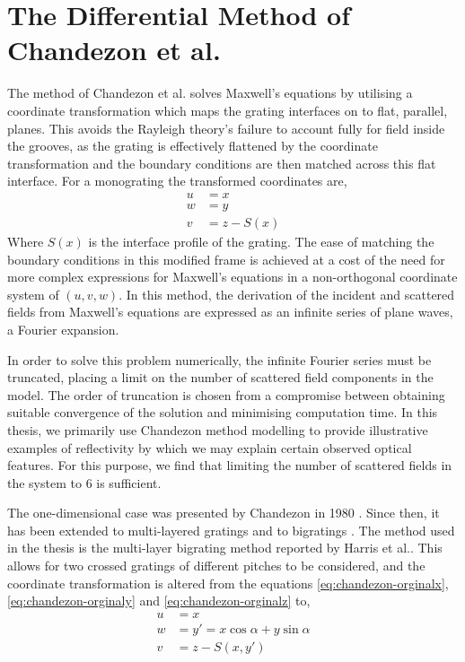 \section{The Differential Method of Chandezon et al.}
The method of Chandezon et al. \cite{Chandezon1980,Chandezon1982} solves Maxwell's equations by utilising a coordinate transformation which maps the grating interfaces on to flat, parallel, planes. This avoids the Rayleigh theory's failure to account fully for field inside the grooves, as the grating is effectively flattened by the coordinate transformation and the boundary conditions are then matched across this flat interface. For a monograting the transformed coordinates are,
\begin{align}
u&=x\label{eq:chandezon-orginalx}\\
w&=y\label{eq:chandezon-orginaly}\\
v&=z-S(x)\label{eq:chandezon-orginalz}
\end{align}
Where $S(x)$ is the interface profile of the grating. The ease of matching the boundary conditions in this modified frame is achieved at a cost of the need for more complex expressions for Maxwell's equations in a non-orthogonal coordinate system of $(u,v,w)$. In this method,  the derivation of the incident and  scattered fields from Maxwell's equations are expressed as an infinite series of plane waves, a Fourier expansion. 

In order to solve this problem numerically, the infinite Fourier series must be truncated, placing a limit on the number of scattered field components in the model. The order of truncation is chosen from a compromise between obtaining suitable convergence of the solution and minimising computation time. In this thesis, we primarily use Chandezon method modelling to provide illustrative examples of reflectivity by which we may explain certain observed optical features. For this purpose, we find that limiting the number of scattered fields in the system to 6 is sufficient.

The one-dimensional case was presented by Chandezon in 1980 \cite{Chandezon1980}. Since then, it has been extended to multi-layered gratings \cite{Cotter1995,Preist1995} and to bigratings \cite{Harris1996}. The method used in the thesis is the multi-layer bigrating method reported by Harris et al.\cite{Harris1996}. This allows for two crossed gratings of different pitches to be considered, and the coordinate transformation is altered from the equations \ref{eq:chandezon-orginalx}, \ref{eq:chandezon-orginaly} and \ref{eq:chandezon-orginalz} to,
\begin{align}
u&=x\\
w&=y'=x \cos{\alpha}+y \sin{\alpha}\\
v&=z-S(x,y')
\end{align}

